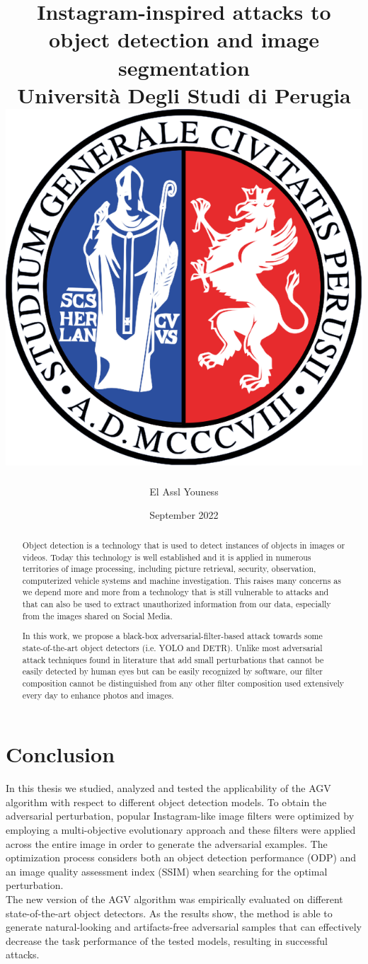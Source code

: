 \documentclass[a4paper,12 pt]{report}
\title{
{Instagram-inspired attacks to object detection and image segmentation}\\
{\large Università Degli Studi di Perugia}\\
\vspace{25pt}
{\includegraphics[scale=0.2]{logo.png}}
}
\author{El Assl Youness}
\date{September 2022}
\begin{document}


\begin{abstract}
    Object detection is a technology that is used to detect instances of objects in images or videos.
Today this technology is well established and it is applied in numerous territories of image processing, including picture retrieval, security, observation, computerized vehicle systems and machine investigation.
This raises many concerns as we depend more and more from a technology that is still vulnerable to attacks and that can also be used to extract unauthorized information from our data, especially from the images shared on Social Media.

In this work, we propose a black-box adversarial-filter-based attack towards some state-of-the-art object detectors (i.e. YOLO and DETR).
Unlike most adversarial attack techniques found in literature that add small perturbations that cannot be easily detected by human eyes but can be easily recognized by software, our filter composition cannot be distinguished from any other filter composition used extensively every day to enhance photos and images.

    
    

  
\end{abstract}

\tableofcontents







\chapter*{Conclusion}

In this thesis we studied, analyzed and tested the applicability of the AGV algorithm with respect to different object detection models.  To obtain the adversarial perturbation, popular Instagram-like image filters were optimized by employing a multi-objective evolutionary approach and these filters were applied across the entire image in order to generate the adversarial examples.  The optimization process considers both an object detection performance (ODP) and an image quality assessment index (SSIM) when searching for the optimal perturbation. \\


 The new version of the AGV algorithm was empirically evaluated on different state-of-the-art object detectors. As the results show, the method is able to generate natural-looking and artifacts-free adversarial samples that can effectively decrease the task performance of the tested models, resulting in successful attacks. \\
\end{document}
